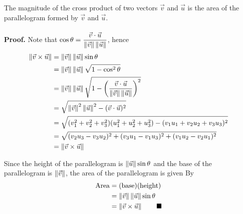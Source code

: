 The magnitude of the cross product of two vectors $\vec{v}$ and $\vec{u}$ is
the area of the parallelogram formed by $\vec{v}$ and $\vec{u}$. ~\\\\
\noindent\textbf{Proof. } Note that $\cos \theta = \dfrac{\vec{v} \cdot
        \vec{u}}{\left\lVert\vec{v}\right\rVert \left\lVert\vec{u}\right\rVert}$, hence
\begin{align*}
    \left\lVert\vec{v} \times \vec{u}\right\rVert & = \left\lVert\vec{v}\right\rVert \left\lVert\vec{u}\right\rVert \sin\theta                                                                            \\
                                  & = \left\lVert\vec{v}\right\rVert \left\lVert\vec{u}\right\rVert \sqrt{1 - \cos^2\theta}                                                               \\
                                  & = \left\lVert\vec{v}\right\rVert \left\lVert\vec{u}\right\rVert \sqrt{1 - \left(\frac{\vec{v} \cdot \vec{u}}{\left\lVert\vec{v}\right\rVert \left\lVert\vec{u}\right\rVert}\right)^2} \\
                                  & = \sqrt{\left\lVert\vec{v}\right\rVert^2 \left\lVert\vec{u}\right\rVert^2 - (\vec{v} \cdot \vec{u})^2}                                                \\
                                  & = \sqrt{(v_1^2 + v_2^2 + v_3^2)(u_1^2 + u_2^2 + u_3^2) - (v_1u_1 + v_2u_2 + v_3u_3)^2}                                \\
                                  & = \sqrt{(v_2u_3 - v_3u_2)^2 + (v_3u_1 - v_1u_3)^2 + (v_1u_2 - v_2u_1)^2}                                              \\
                                  & = \left\lVert\vec{v} \times \vec{u}\right\rVert
\end{align*}
\vspace{0.8em}
\begin{center}
\end{center}
Since the height of the parallelogram is $\left\lVert\vec{u}\right\rVert \sin\theta$ and the base of the parallelogram is $\left\lVert\vec{v}\right\rVert$, the area of the parallelogram is given By
\begin{align*}
    \text{Area} & = (\text{base})(\text{height})                      \\
                & = \left\lVert\vec{v}\right\rVert \left\lVert\vec{u}\right\rVert \sin\theta          \\
                & = \left\lVert\vec{v} \times \vec{u}\right\rVert \qquad \blacksquare
\end{align*}

